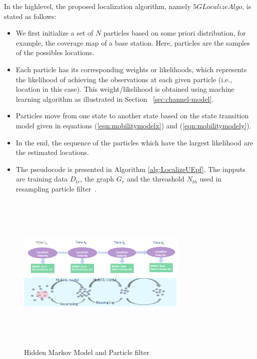 \documentclass[conference, 10pt]{IEEEtran}
\begin{document}
In the highlevel, the proposed localization algorithm, namely $5GLocalizeAlgo$, is stated as follows:
\begin{itemize}
	\item We first initialize a set of $N$ particles based on some priori distribution, for example, the coverage map of a base station.
	Here, particles are the samples of the possibles locations. 
	\item Each particle has its corresponding weights or likelihoods, which represents the likelihood of achieving the observations at each given particle (i.e., location in this case). This weight/likelihood is obtained using machine learning algorithm as illustrated in Section ~\ref{sec:channel-model}.
	\item Particles move from one state to another state based 
	on the state transition model given in equations (\ref{eqn:mobilitymodelx}) and (\ref{eqn:mobilitymodely}).
	\item In the end, the sequence of the particles which have the largest likelihood are the estimated locations. 
	\item The pseudocode is presented in Algorithm \ref{alg:LocalizeUEpf}. The inpputs are training data $D_{tr}$, the graph $G_r$ and the threashold $N_{th}$ used in resampling particle filter~\cite{ThrunParticleFilter}.
\end{itemize}

\begin{figure}[t]
	\begin{center}
	\includegraphics[height=3in,width=3.2in]{./HMM_ParticleFilter_Illustration.png}
	\caption{\label{fig:hmm_particle}
	{\small Hidden Markov Model and Particle filter}}
	\end{center}
	\end{figure}
\end{document}
